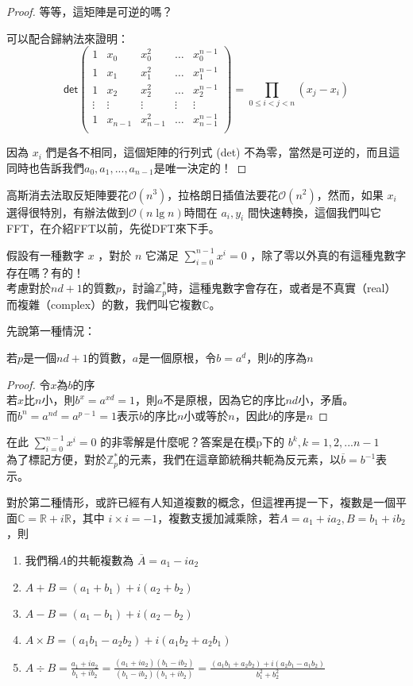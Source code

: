 \begin{proof}
等等，這矩陣是可逆的嗎？

可以配合歸納法來證明：
\[
\textsf{det}
\left(		
\begin{array}{ccccc}		
   1 & x_0 & x_0^2 & \dots & x_0^{n-1}  \\		
   1 & x_1 &  x_1^2 & \dots & x_1^{n-1}  \\	
   1 & x_2 &  x_2^2 & \dots & x_2^{n-1}  \\	
   \vdots & \vdots & \vdots & \vdots & \vdots \\	
   1 & x_{n-1} & x_{n-1}^2 & \dots & x_{n-1}^{n-1} \\		
    \end{array}		
\right)		
=
\prod_{0\leq i<j<n}(x_j-x_i)
 \]

因為 $x_i$ 們是各不相同，這個矩陣的行列式 (det) 不為零，當然是可逆的，而且這同時也告訴我們$a_0,a_1,...,a_{n-1}$是唯一決定的！
\end{proof}

高斯消去法取反矩陣要花$\mathcal{O}(n^3)$，拉格朗日插值法要花$\mathcal{O}(n^2)$，然而，如果 $x_i$ 選得很特別，有辦法做到$\mathcal{O}(n\lg n)$時間在 $a_i,y_i$ 間快速轉換，這個我們叫它FFT，在介紹FFT以前，先從DFT來下手。


假設有一種數字 $x$ ，對於 $n$ 它滿足 $\sum_{i=0}^{n-1}x^i=0$ ，除了零以外真的有這種鬼數字存在嗎？有的！\\
考慮對於$nd+1$的質數$p$，討論$\mathbb Z_p^*$時，這種鬼數字會存在，或者是不真實（real）而複雜（complex）的數，我們叫它複數$\mathbb{C}$。

先說第一種情況：
\begin{theorem}
\label{prime}
若$p$是一個$nd+1$的質數，$a$是一個原根，令$b=a^d$，則$b$的序為$n$
\end{theorem}
\begin{proof}
令$x$為$b$的序\\
若$x$比$n$小，則$b^x=a^{xd}=1$，則$a$不是原根，因為它的序比$nd$小，矛盾。\\
而$b^n=a^{nd}=a^{p-1}=1$表示$b$的序比$n$小或等於$n$，因此$b$的序是$n$
\end{proof}
在此 $\sum_{i=0}^{n-1}x^i=0$ 的非零解是什麼呢？答案是在模p下的 $b^k, k = 1,2,...n-1$\\
為了標記方便，對於$\mathbb{Z}_p^*$的元素，我們在這章節統稱共軛為反元素，以$\overline{b}=b^{-1}$表示。

對於第二種情形，或許已經有人知道複數的概念，但這裡再提一下，複數是一個平面$\mathbb{C}=\mathbb R+i\mathbb R$，其中 $i\times i = -1$，複數支援加減乘除，若$A=a_1+ia_2,B=b_1+ib_2$，則
\begin{enumerate}
\item 我們稱$A$的共軛複數為 $\overline{A}=a_1-ia_2$
\item $A+B=(a_1+b_1)+i(a_2+b_2)$
\item $A-B=(a_1-b_1)+i(a_2-b_2)$
\item $A\times B=(a_1b_1-a_2b_2)+i(a_1b_2+a_2b_1)$
\item $A\div B=\frac{a_1+ia_2}{b_1+ib_2}=\frac {(a_1+ia_2)(b_1-ib_2)}{(b_1-ib_2)(b_1+ib_2)}=\frac {(a_1b_1+a_2b_2)+i(a_2b_1-a_1b_2)}{b_1^2+b_2^2}$
\end{enumerate}

